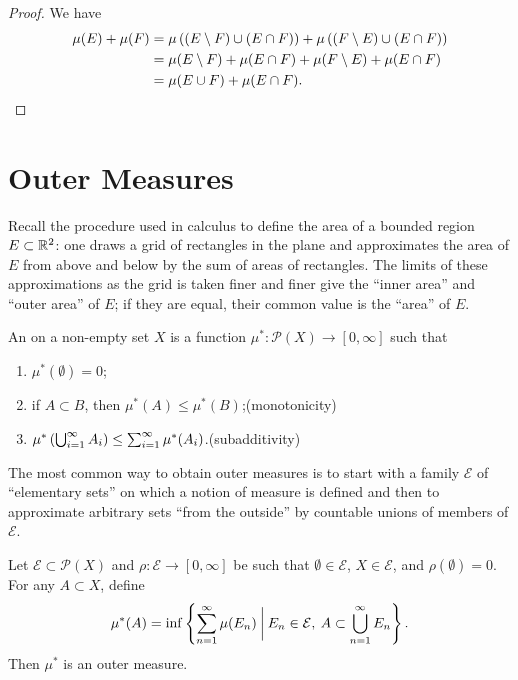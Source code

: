 \begin{proof}
We have
\begin{align*}
\mu(E)+\mu(F)
&=\mu\left((E\setminus F)\cup(E\cap F)\right)+\mu\left((F\setminus E)\cup(E\cap F)\right)\\
&=\mu(E\setminus F)+\mu(E\cap F)+\mu(F\setminus E)+\mu(E\cap F)\\
&=\mu(E\cup F)+\mu(E\cap F).
\end{align*}
\end{proof}
\pagebreak

\section{Outer Measures}
Recall the procedure used in calculus to define the area of a bounded region $E\subset\mathbb R^2$: one draws a grid of rectangles in the plane and approximates the area of $E$ from above and below by the sum of areas of rectangles. 
The limits of these approximations as the grid is taken finer and finer give the ``inner area'' and ``outer area'' of $E$; if they are equal, their common value is the ``area'' of $E$.



\begin{definition}
An  on a non-empty set $X$ is a function $\mu^*\colon\mathcal{P}(X)\to[0,\infty]$ such that
\begin{enumerate}[label=(\roman*)]
\item $\mu^*(\emptyset)=0$;
\item if $A\subset B$, then $\mu^*(A)\le\mu^*(B)$;\hfill(monotonicity)
\item $\mu^*\left(\bigcup_{i=1}^{\infty}A_i\right)\le\sum_{i=1}^{\infty}\mu^*(A_i)$.\hfill(subadditivity)
\end{enumerate}
\end{definition}

The most common way to obtain outer measures is to start with a family $\mathcal{E}$ of ``elementary sets'' on which a notion of measure is defined and then to approximate arbitrary sets ``from the outside'' by countable unions of members of $\mathcal{E}$.

\begin{proposition}
Let $\mathcal{E}\subset\mathcal{P}(X)$ and $\rho\colon\mathcal{E}\to[0,\infty]$ be such that $\emptyset\in\mathcal{E}$, $X\in\mathcal{E}$, and $\rho(\emptyset)=0$. For any $A\subset X$, define
\[\mu^*(A)=\inf\left\{\sum_{n=1}^{\infty}\mu(E_n)\:\bigg|\:E_n\in\mathcal{E},\:A\subset\bigcup_{n=1}^{\infty}E_n\right\}.\]
Then $\mu^*$ is an outer measure.
\end{proposition}

